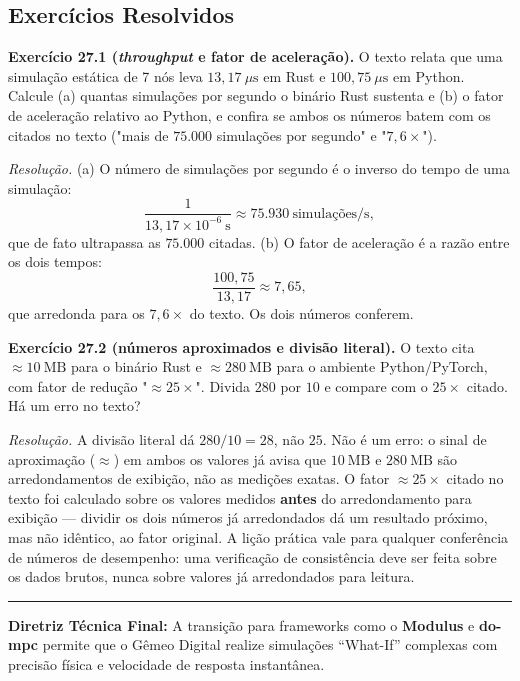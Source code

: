 \documentclass[12pt,a4paper]{article}
\numberwithin{equation}{section}
\numberwithin{table}{section}
\numberwithin{figure}{section}
\begin{document}
{	\subsection{Exercícios Resolvidos}

	\textbf{Exercício 27.1 (\textit{throughput} e fator de aceleração).}
	O texto relata que uma simulação estática de 7 nós leva
	$13{,}17\ \mu\text{s}$ em Rust e $100{,}75\ \mu\text{s}$ em Python.
	Calcule (a) quantas simulações por segundo o binário Rust sustenta e
	(b) o fator de aceleração relativo ao Python, e confira se ambos os
	números batem com os citados no texto ("mais de $75.000$ simulações
	por segundo" e "$7{,}6\times$").

	\emph{Resolução.} (a) O número de simulações por segundo é o inverso
	do tempo de uma simulação:
	$$\frac{1}{13{,}17\times 10^{-6}\ \mathrm{s}} \approx 75{.}930\
	\text{simulações/s},$$
	que de fato ultrapassa as $75.000$ citadas. (b) O fator de aceleração
	é a razão entre os dois tempos:
	$$\frac{100{,}75}{13{,}17} \approx 7{,}65,$$
	que arredonda para os $7{,}6\times$ do texto. Os dois números
	conferem.

	\textbf{Exercício 27.2 (números aproximados e divisão literal).} O
	texto cita $\approx 10\ \text{MB}$ para o binário Rust e
	$\approx 280\ \text{MB}$ para o ambiente Python/PyTorch, com fator de
	redução "$\approx 25\times$". Divida $280$ por $10$ e compare com o
	$25\times$ citado. Há um erro no texto?

	\emph{Resolução.} A divisão literal dá $280/10 = 28$, não $25$. Não é
	um erro: o sinal de aproximação ($\approx$) em ambos os valores já
	avisa que $10\ \text{MB}$ e $280\ \text{MB}$ são arredondamentos de
	exibição,
	não as medições exatas. O fator $\approx 25\times$ citado no texto foi
	calculado sobre os valores medidos \textbf{antes} do arredondamento
	para exibição --- dividir os dois números já arredondados dá um
	resultado próximo, mas não idêntico, ao fator original. A lição
	prática vale para qualquer conferência de números de desempenho: uma
	verificação de consistência deve ser feita sobre os dados brutos,
	nunca sobre valores já arredondados para leitura.

	\vspace{1em}
	\hrule
	\vspace{1em}

	\textbf{Diretriz Técnica Final:} A transição para frameworks como o \textbf{Modulus} e \textbf{do-mpc} permite que o Gêmeo Digital realize simulações ``What-If'' complexas com precisão física e velocidade de resposta instantânea.

}
\end{document}
